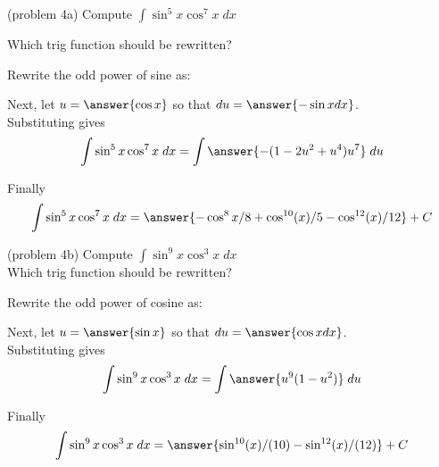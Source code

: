 \documentclass[handout]{ximera}
\begin{document}
\begin{problem}{\color{gray}(problem 4a)}
Compute $\displaystyle{\int \sin^5 x\cos^7 x \; dx}$

Which trig function should be rewritten?

\begin{multipleChoice}
\end{multipleChoice}

Rewrite the odd power of sine as:
\begin{multipleChoice}
\end{multipleChoice}

Next, let $u = \answer{\cos x}$ so that $du = \answer{-\sin x dx}$.\\

Substituting gives
\[
\int \sin^5 x\cos^7 x \; dx= \int \answer{-(1-2u^2 + u^4)u^7} \; du
\]

Finally
\[
\int \sin^5 x\cos^7 x \; dx= \answer{-\cos^8 x/8 + \cos^{10}(x)/5 - \cos^{12}(x)/12} + C
\]
\end{problem}



\begin{problem}(problem 4b)
Compute $\displaystyle{\int \sin^9 x\cos^3 x \; dx}$\\

Which trig function should be rewritten?
\begin{multipleChoice}
\end{multipleChoice}

Rewrite the odd power of cosine as:
\begin{multipleChoice}
\end{multipleChoice}

Next, let $u = \answer{\sin x}$ so that $du = \answer{\cos x dx}$.\\

Substituting gives
\[
\int \sin^9 x\cos^3 x \; dx= \int \answer{u^9(1 - u^2)} \; du
\]

Finally
\[
\int \sin^9 x\cos^3 x \; dx= \answer{\sin^{10}(x)/(10) - \sin^{12}(x)/(12) } + C
\]
\end{problem}
\end{document}
